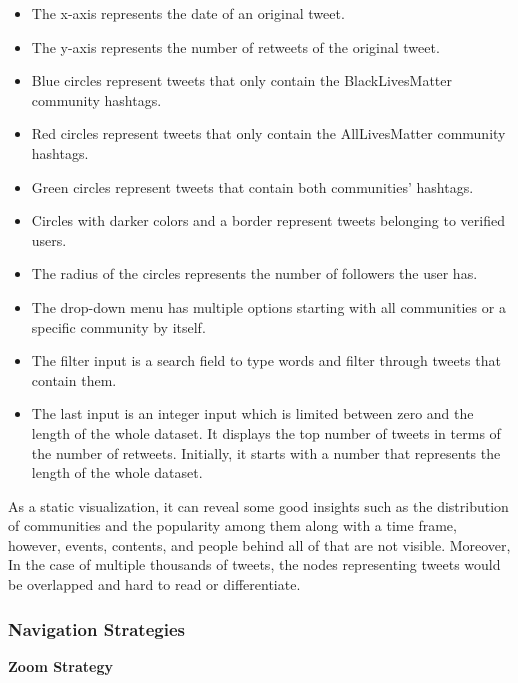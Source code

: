 \begin{itemize}
    \item The x-axis represents the date of an original tweet.  
    \item The y-axis represents the number of retweets of the original tweet.
    \item Blue circles represent tweets that only contain the BlackLivesMatter community hashtags.
    \item Red circles represent tweets that only contain the AllLivesMatter community hashtags.
    \item Green circles represent tweets that contain both communities' hashtags.
    \item Circles with darker colors and a border represent tweets belonging to verified users.
    \item The radius of the circles represents the number of followers the user has.
    \item The drop-down menu has multiple options starting with all communities or a specific community by itself.
    \item The filter input is a search field to type words and filter through tweets that contain them.
    \item The last input is an integer input which is limited between zero and the length of the whole dataset. It displays the top number of tweets in terms of the number of retweets. Initially, it starts with a number that represents the length of the whole dataset.  

\end{itemize}

As a static visualization, it can reveal some good insights such as the distribution of communities and the popularity among them along with a time frame, however, events, contents, and people behind all of that are not visible. Moreover, In the case of multiple thousands of tweets, the nodes representing tweets would be overlapped and hard to read or differentiate.  


\subsubsection{Navigation Strategies}

\textbf{Zoom Strategy}

